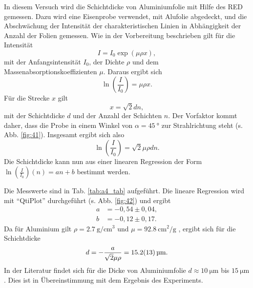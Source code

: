 In diesem Versuch wird die Schichtdicke von Aluminiumfolie mit Hilfe des RED gemessen. Dazu wird eine Eisenprobe verwendet, mit Alufolie abgedeckt, und die Abschwächung der Intensität der charakteristischen Linien in Abhängigkeit der Anzahl der Folien gemessen.
Wie in der Vorbereitung beschrieben gilt für die Intensität
\begin{equation}
 I = I_{0}\exp\left(\mu\rho x\right),
\end{equation}
mit der Anfangsintensität $I_{0}$, der Dichte $\rho$ und dem Massenabsorptionskoeffizienten $\mu$.
Daraus ergibt sich
\begin{equation}
 \ln\left(\frac{I}{I_{0}}\right) = \mu\rho x.
\end{equation}
Für die Strecke $x$ gilt
\begin{equation}
 x = \sqrt{2}dn,
\end{equation}
mit der Schichtdicke $d$ und der Anzahl der Schichten $n$. Der Vorfaktor kommt daher, dass die Probe in einem Winkel von $\alpha=\SI{45}{\degree}$ zur Strahlrichtung steht (s. Abb. \ref{fig:41}). 
Insgesamt ergibt sich also
\begin{equation}
 \ln\left(\frac{I}{I_{0}}\right) = \sqrt{2}\mu\rho dn. 
\end{equation}
Die Schichtdicke kann nun aus einer linearen Regression der Form $\ln\left(\frac{I}{I_{0}}\right)(n) = an+b$ bestimmt werden.


Die Messwerte sind in Tab. \ref{tab:a4_tab} aufgeführt.
Die lineare Regression wird mit ``QtiPlot'' durchgeführt (s. Abb. \ref{fig:42}) und ergibt
\begin{align}
 a &= -0,54 \pm 0,04, \\
 b &= -0,12 \pm 0,17.
\end{align}
Da für Aluminium gilt $\rho=\SI{2,7}{\gram\per\centi\metre\cubed}$ und $\mu=\SI{92,8}{\centi\metre\squared\per\gram}$ \cite{litmap}, ergibt sich für die Schichtdicke
\begin{equation}
 d = -\frac{a}{\sqrt{2}\mu\rho} = \SI{15,2\pm1,3}{\micro\metre}.
\end{equation}
In der Literatur findet sich für die Dicke von Aluminiumfolie $d\approx\SI{10}{\micro\metre}$ bis $\SI{15}{\micro\metre}$ \cite{wiki}. Dies ist in Übereinstimmung mit dem Ergebnis des Experiments.

